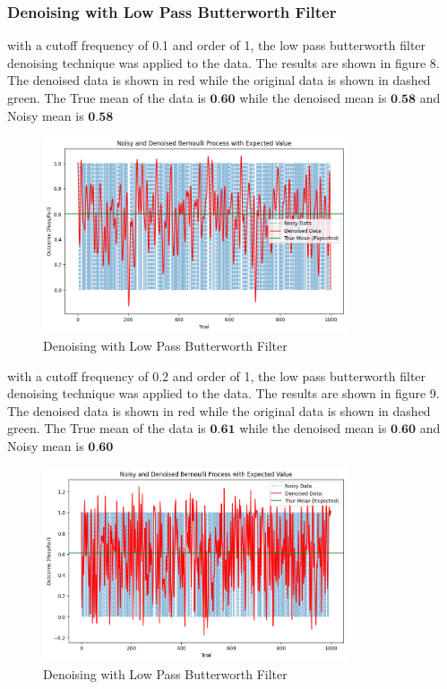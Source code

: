 \documentclass[a4paper,12pt]{article} %
\begin{document}
\subsubsection{ Denoising with Low Pass Butterworth Filter}
with a cutoff frequency of 0.1 and order of 1, the low pass butterworth filter denoising technique was applied to the data. The results are shown in figure 8. The denoised data is shown in red while the original data is shown in dashed green. The True mean of the data is \(\textbf{0.60}\) while the denoised mean is \(\textbf{0.58}\) and Noisy mean is \(\textbf{0.58}\)
\begin{figure}[h]
\centering
\includegraphics[width=0.8\textwidth]{butterworth_0.1_1.png}
\caption{Denoising with Low Pass Butterworth Filter}
\end{figure}
\clearpage
with a cutoff frequency of 0.2 and order of 1, the low pass butterworth filter denoising technique was applied to the data. The results are shown in figure 9. The denoised data is shown in red while the original data is shown in dashed green. The True mean of the data is \(\textbf{0.61}\) while the denoised mean is \(\textbf{0.60}\) and Noisy mean is \(\textbf{0.60}\)
\begin{figure}[h]
\centering
\includegraphics[width=0.8\textwidth]{2.png}
\caption{Denoising with Low Pass Butterworth Filter}
\end{figure}
\end{document}
